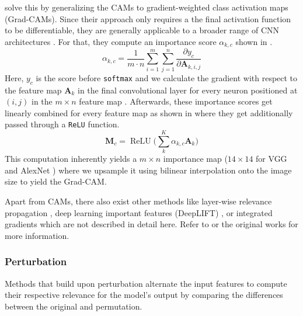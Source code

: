 \citet{SelvarajuCDVPB17} solve this by generalizing the CAMs to gradient-weighted class activation maps (Grad-CAMs). Since their approach only requires a the final activation function to be differentiable, they are generally applicable to a broader range of CNN architectures \citep{SelvarajuCDVPB17, xie2020explainable}. For that, they compute an importance score $\alpha_{k,c}$ shown in .
\begin{equation}
\label{eq:grad_cam_importance}
    \alpha_{k,c} = \frac{1}{m\cdot n}\sum_{i=1}^m\sum_{j=1}^n \frac{\partial y_c}{\partial \mathbf{A}_{k,i,j}}
\end{equation}
Here, $y_c$ is the score before \texttt{softmax} and we calculate the gradient with respect to the feature map $\mathbf{A}_k$ in the final convolutional layer for every neuron positioned at $(i,j)$ in the $m\times n$ feature map \citep{SelvarajuCDVPB17, xie2020explainable}. Afterwards, these importance scores get linearly combined for every feature map as shown in  where they get additionally passed through a \texttt{ReLU} function.
\begin{equation}
\label{eq:grad_cam_map}
    \mathbf{M}_c = \operatorname{ReLU}\Big(\sum_k^K \alpha_{k,c} \mathbf{A}_k \Big)
\end{equation}
This computation inherently yields a $m \times n$ importance map ($14 \times 14$ for VGG \citep{SimonyanZ14a} and AlexNet \citep{KrizhevskySH12}) where we upsample it using bilinear interpolation onto the image size to yield the Grad-CAM.

Apart from CAMs, there also exist other methods like layer-wise relevance propagation \citep{MontavonLBSM17, DingLLS17, LapuschkinBMMS16, Bach2015}, deep learning important features (DeepLIFT) \citep{ShrikumarGK17}, or integrated gradients \citep{SundararajanTY17} which are not described in detail here. Refer to \citet{xie2020explainable} or the original works for more information.

\subsubsection{Perturbation}
Methods that build upon perturbation alternate the input features to compute their respective relevance for the model's output by comparing the differences between the original and permutation.

